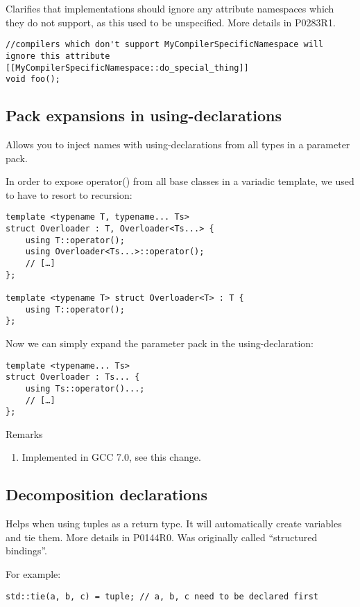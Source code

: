 Clarifies that implementations should ignore any attribute namespaces which they do not support, as this used to be unspecified. More details in P0283R1.
\begin{verbatim}
//compilers which don't support MyCompilerSpecificNamespace will ignore this attribute
[[MyCompilerSpecificNamespace::do_special_thing]] 
void foo();
\end{verbatim}

\subsection{Pack expansions in using-declarations}

Allows you to inject names with using-declarations from all types in a parameter pack.

In order to expose operator() from all base classes in a variadic template, we used to have to resort to recursion:

\begin{verbatim}
template <typename T, typename... Ts>
struct Overloader : T, Overloader<Ts...> {
    using T::operator();
    using Overloader<Ts...>::operator();
    // […]
};

template <typename T> struct Overloader<T> : T {
    using T::operator();
};
\end{verbatim}

Now we can simply expand the parameter pack in the using-declaration:

\begin{verbatim}
template <typename... Ts>
struct Overloader : Ts... {
    using Ts::operator()...;
    // […]
};
\end{verbatim}

Remarks
\begin{enumerate}
\item Implemented in GCC 7.0, see this change.
\end{enumerate}

\subsection{Decomposition declarations}

Helps when using tuples as a return type. It will automatically create variables and tie them. More details in P0144R0. Was originally called “structured bindings”.

For example:

\begin{verbatim}
std::tie(a, b, c) = tuple; // a, b, c need to be declared first
\end{verbatim}

